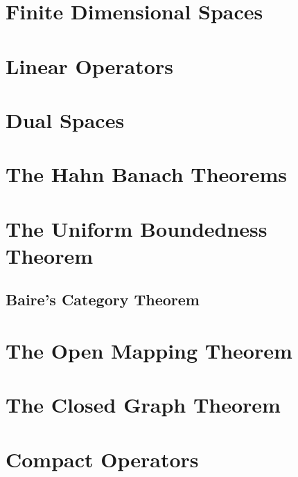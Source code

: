 \documentclass{article}
\begin{document}
\section{Finite Dimensional Spaces}  

\section{Linear Operators}  

\section{Dual Spaces}  

\section{The Hahn Banach Theorems}  

\section{The Uniform Boundedness Theorem}
\subsection{Baire's Category Theorem}
\section{The Open Mapping Theorem}  

\section{The Closed Graph Theorem}  

\section{Compact Operators}
\end{document}
